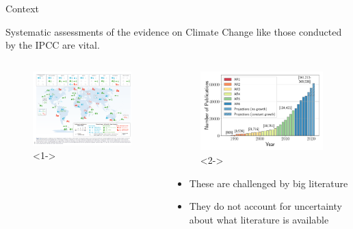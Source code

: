 \documentclass[9pt]{beamer}
\begin{document}
\begin{frame}{Context}

Systematic assessments of the evidence on Climate Change like those conducted by the IPCC are vital.

\begin{columns}
	\begin{column}{0.618\linewidth}
		\begin{figure}
			\includegraphics[width=\linewidth]{../map_18.png}<1->
		\end{figure}
	\end{column}
	\begin{column}{0.312\linewidth}
		
		\begin{figure}
			\includegraphics[width=\linewidth]{images/pubs_time_wgb_lp.pdf}<2->
		\end{figure}
		
		\begin{itemize}
			\small
			\item<2->These are challenged by big literature 
			\item<3->They do not account for uncertainty about what literature is available
		\end{itemize}
	\end{column}
\end{columns}

\end{frame}
\end{document}

